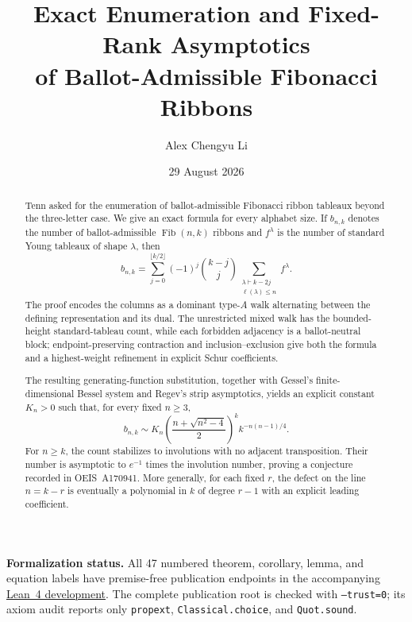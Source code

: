 \documentclass[11pt]{article}
\title{Exact Enumeration and Fixed-Rank Asymptotics\\
of Ballot-Admissible Fibonacci Ribbons}
\author{Alex Chengyu Li}
\date{29 August 2026}
\theoremstyle{definition}
\newcommand{\ellp}{\ell}
\begin{document}
\maketitle

\begin{center}
\begin{minipage}{0.88\textwidth}
\textbf{Formalization status.}
All 47 numbered theorem, corollary, lemma, and equation labels have
premise-free publication endpoints in the accompanying
\href{https://github.com/crabsatellite/fibonacci-ribbon-ballot-enumeration}{Lean~4 development}.
The complete publication root is checked with \texttt{--trust=0}; its axiom
audit reports only \texttt{propext}, \texttt{Classical.choice}, and
\texttt{Quot.sound}.
\end{minipage}
\end{center}
\medskip

\begin{abstract}
Tenn asked for the enumeration of ballot-admissible Fibonacci ribbon
tableaux beyond the three-letter case.  We give an exact formula for every
alphabet size.  If $b_{n,k}$ denotes the number of ballot-admissible
$\operatorname{Fib}(n,k)$ ribbons and $f^\lambda$ is the number of standard
Young tableaux of shape $\lambda$, then
\[
 b_{n,k}=\sum_{j=0}^{\lfloor k/2\rfloor}(-1)^j
 \binom{k-j}{j}
 \sum_{\substack{\lambda\vdash k-2j\\\ellp(\lambda)\le n}}f^\lambda.
\]
The proof encodes the columns as a dominant type-$A$ walk alternating between
the defining representation and its dual.  The unrestricted mixed walk has
the bounded-height standard-tableau count, while each forbidden adjacency is
a ballot-neutral block; endpoint-preserving contraction and
inclusion--exclusion give both the formula and a highest-weight refinement in
explicit Schur coefficients.

The resulting generating-function substitution, together with Gessel's
finite-dimensional Bessel system and Regev's strip asymptotics, yields an
explicit constant $K_n>0$ such that, for every fixed $n\ge3$,
\[
 b_{n,k}\sim K_n
 \left(\frac{n+\sqrt{n^2-4}}2\right)^k k^{-n(n-1)/4}.
\]
For $n\ge k$, the count stabilizes to involutions with no adjacent
transposition.  Their number is asymptotic to $e^{-1}$ times the involution
number, proving a conjecture recorded in OEIS~A170941.  More generally, for
each fixed $r$, the defect on the line $n=k-r$ is eventually a polynomial in
$k$ of degree $r-1$ with an explicit leading coefficient.
\end{abstract}
\end{document}
